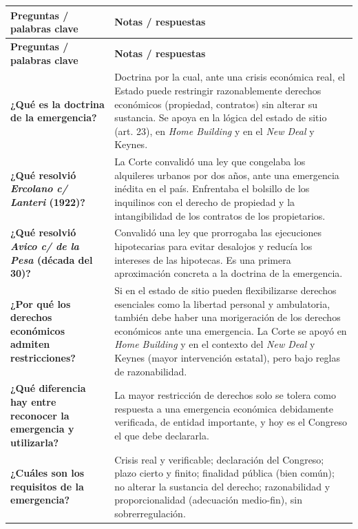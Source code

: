 \documentclass[12pt,oneside]{book}
\newlength{\cornellL}
\newlength{\cornellR}
\begin{document}
\begin{longtable}{|>{\raggedright\arraybackslash}p{\cornellL}|>{\raggedright\arraybackslash}p{\cornellR}|}
\hline
\textbf{Preguntas / palabras clave} & \textbf{Notas / respuestas} \\
\hline
\endfirsthead
\hline
\textbf{Preguntas / palabras clave} & \textbf{Notas / respuestas} \\
\hline
\endhead

\textbf{¿Qué es la doctrina de la emergencia?} &
Doctrina por la cual, ante una crisis económica real, el Estado puede restringir razonablemente derechos económicos (propiedad, contratos) sin alterar su sustancia. Se apoya en la lógica del estado de sitio (art. 23), en \textit{Home Building} y en el \textit{New Deal} y Keynes. \\
\hline

\textbf{¿Qué resolvió \textit{Ercolano c/ Lanteri} (1922)?} &
La Corte convalidó una ley que congelaba los alquileres urbanos por dos años, ante una emergencia inédita en el país. Enfrentaba el bolsillo de los inquilinos con el derecho de propiedad y la intangibilidad de los contratos de los propietarios. \\
\hline

\textbf{¿Qué resolvió \textit{Avico c/ de la Pesa} (década del 30)?} &
Convalidó una ley que prorrogaba las ejecuciones hipotecarias para evitar desalojos y reducía los intereses de las hipotecas. Es una primera aproximación concreta a la doctrina de la emergencia. \\
\hline

\textbf{¿Por qué los derechos económicos admiten restricciones?} &
Si en el estado de sitio pueden flexibilizarse derechos esenciales como la libertad personal y ambulatoria, también debe haber una morigeración de los derechos económicos ante una emergencia. La Corte se apoyó en \textit{Home Building} y en el contexto del \textit{New Deal} y Keynes (mayor intervención estatal), pero bajo reglas de razonabilidad. \\
\hline

\textbf{¿Qué diferencia hay entre reconocer la emergencia y utilizarla?} &
La mayor restricción de derechos solo se tolera como respuesta a una emergencia económica debidamente verificada, de entidad importante, y hoy es el Congreso el que debe declararla. \\
\hline

\textbf{¿Cuáles son los requisitos de la emergencia?} &
Crisis real y verificable; declaración del Congreso; plazo cierto y finito; finalidad pública (bien común); no alterar la sustancia del derecho; razonabilidad y proporcionalidad (adecuación medio-fin), sin sobrerregulación. \\
\hline


\end{longtable}
\end{document}
